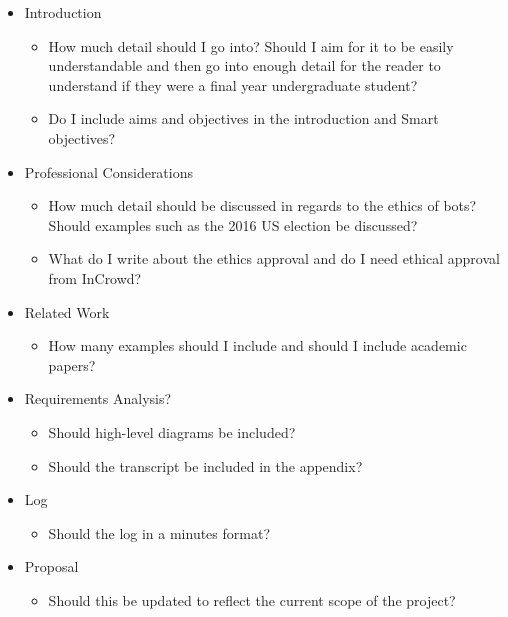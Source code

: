 \begin{appendices}
\begin{itemize} 
 
  \item Introduction
  \begin{itemize}
    
     \item  How much detail should I go into? Should I aim for it to be easily understandable and then go into enough detail for the reader to understand if they were a final year undergraduate student? 
     \item Do I include aims and objectives in the introduction and Smart objectives?
  \end{itemize}
  \item Professional Considerations
    \begin{itemize}
    
     \item How much detail should be discussed in regards to the ethics of bots?
     Should examples such as the 2016 US election be discussed?
     \item What do I write about the ethics approval and do I need ethical approval from InCrowd?
    \end{itemize}
  \item Related Work
    \begin{itemize}
    
     \item How many examples should I include and should I include academic papers?
    \end{itemize}
  \item Requirements Analysis?
    \begin{itemize}
    
     \item Should high-level diagrams be included?
     \item Should the transcript be included in the appendix?
    \end{itemize}
  \item Log
    \begin{itemize}
    
     \item Should the log in a minutes format?
    \end{itemize}
  \item Proposal
    \begin{itemize}
    
     \item Should this be updated to reflect the current scope of the project?
    \end{itemize}
\end{itemize}


\end{appendices}
